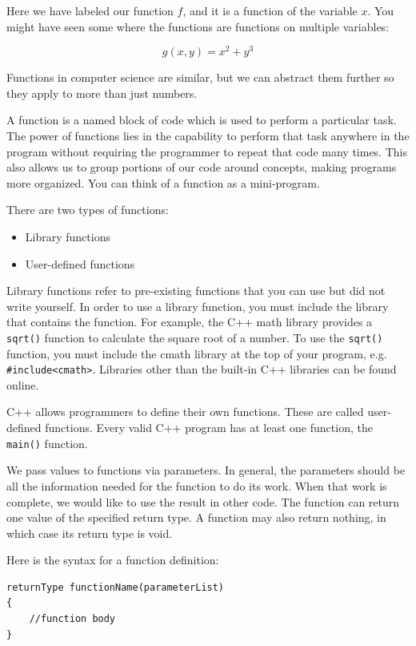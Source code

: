 Here we have labeled our function $f$, and it is a function of the variable $x$. You might have seen some where the functions are functions on multiple variables:

$$g(x,y) = x^2+y^3$$

Functions in computer science are similar, but we can abstract them further so they apply to more than just numbers. 

A function is a named block of code which is used to perform a particular task. The power of functions lies in the capability to perform that task anywhere in the program without requiring the programmer to repeat that code many times. This also allows us to group portions of our code around concepts, making programs more organized. You can think of a function as a mini-program.

There are two types of functions:

\begin{itemize}
    \item Library functions
    \item User-defined functions
\end{itemize}

Library functions refer to pre-existing functions that you can use but did not write yourself. In order to use a library function, you must include the library that contains the function. For example, the C++ math library provides a \texttt{sqrt()} function to calculate the square root of a number. To use the \texttt{sqrt()} function, you must include the cmath library at the top of your program, e.g. \texttt{#include<cmath>}. Libraries other than the built-in C++ libraries can be found online.

C++ allows programmers to define their own functions. These are called user-defined functions. Every valid C++ program has at least one function, the \texttt{main()} function.

We pass values to functions via parameters. In general, the parameters should be all the information needed for the function to do its work. When that work is complete, we would like to use the result in other code. The function can return one value of the specified return type. A function may also return nothing, in which case its return type is void.

Here is the syntax for a function definition:

\begin{verbatim}
returnType functionName(parameterList)
{
    //function body
}
\end{verbatim}

